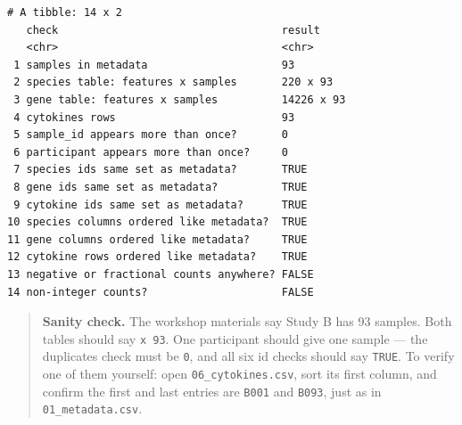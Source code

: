 \documentclass[
  letterpaper,
  DIV=11,
  numbers=noendperiod]{scrartcl}
\newenvironment{Shaded}{\begin{snugshade}}{\end{snugshade}}
\newcommand{\DecValTok}[1]{\textcolor[rgb]{0.68,0.00,0.00}{#1}}
\newcommand{\FunctionTok}[1]{\textcolor[rgb]{0.28,0.35,0.67}{#1}}
\newcommand{\NormalTok}[1]{\textcolor[rgb]{0.00,0.23,0.31}{#1}}
\newcommand{\SpecialCharTok}[1]{\textcolor[rgb]{0.37,0.37,0.37}{#1}}
\begin{document}
\begin{Shaded}
\end{Shaded}

\begin{verbatim}
# A tibble: 14 x 2
   check                                   result    
   <chr>                                   <chr>     
 1 samples in metadata                     93        
 2 species table: features x samples       220 x 93  
 3 gene table: features x samples          14226 x 93
 4 cytokines rows                          93        
 5 sample_id appears more than once?       0         
 6 participant appears more than once?     0         
 7 species ids same set as metadata?       TRUE      
 8 gene ids same set as metadata?          TRUE      
 9 cytokine ids same set as metadata?      TRUE      
10 species columns ordered like metadata?  TRUE      
11 gene columns ordered like metadata?     TRUE      
12 cytokine rows ordered like metadata?    TRUE      
13 negative or fractional counts anywhere? FALSE     
14 non-integer counts?                     FALSE     
\end{verbatim}

\begin{quote}
\textbf{Sanity check.} The workshop materials say Study B has 93
samples. Both tables should say \texttt{x\ 93}. One participant should
give one sample --- the duplicates check must be \texttt{0}, and all six
id checks should say \texttt{TRUE}. To verify one of them yourself: open
\texttt{06\_cytokines.csv}, sort its first column, and confirm the first
and last entries are \texttt{B001} and \texttt{B093}, just as in
\texttt{01\_metadata.csv}.
\end{quote}
\end{document}
